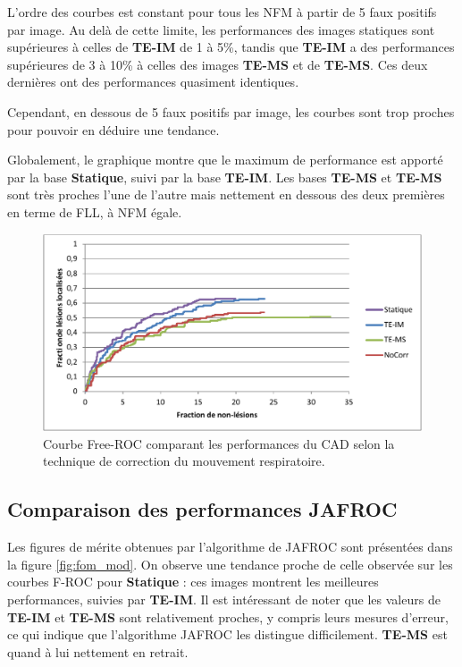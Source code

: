 L'ordre des courbes est constant pour tous les NFM à partir de 5 faux positifs par image. Au delà de cette limite, les performances des images statiques sont supérieures à celles de \textbf{TE-IM} de 1 à 5\%, tandis que \textbf{TE-IM} a des performances supérieures de 3 à 10\% à celles des images \textbf{TE-MS} et de \textbf{TE-MS}. Ces deux dernières ont des performances quasiment identiques.

Cependant, en dessous de 5 faux positifs par image, les courbes sont trop proches pour pouvoir en déduire une tendance.


Globalement, le graphique montre que le maximum de performance est apporté par la base \textbf{Statique}, suivi par la base \textbf{TE-IM}. Les bases \textbf{TE-MS} et \textbf{TE-MS} sont très proches l'une de l'autre mais nettement en dessous des deux premières en terme de FLL, à NFM égale.

\begin{figure}[h!]
 \begin{center}
   \includegraphics[width=13cm]{images/FROC_mod}
 \end{center}
 \caption{Courbe Free-ROC comparant les performances du CAD selon la technique de correction du mouvement respiratoire.}
 \label{fig:froc_mod}
\end{figure}


\subsection{Comparaison des performances JAFROC}

Les figures de mérite obtenues par l'algorithme de JAFROC sont présentées dans la figure \ref{fig:fom_mod}. On observe une tendance proche de celle observée sur les courbes F-ROC pour \textbf{Statique} : ces images montrent les meilleures performances, suivies par \textbf{TE-IM}. Il est intéressant de noter que les valeurs de \textbf{TE-IM} et \textbf{TE-MS} sont relativement proches, y compris leurs mesures d'erreur, ce qui indique que l'algorithme JAFROC les distingue difficilement. \textbf{TE-MS} est quand à lui nettement en retrait. 

